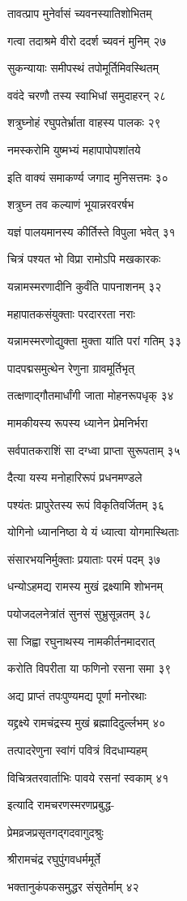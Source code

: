 तावत्प्राप मुनेर्वासं च्यवनस्यातिशोभितम्

गत्वा तदाश्रमे वीरो ददर्श च्यवनं मुनिम् २७

सुकन्यायाः समीपस्थं तपोमूर्तिमिवस्थितम्

ववंदे चरणौ तस्य स्वाभिधां समुदाहरन् २८

शत्रुघ्नोहं रघुपतेर्भ्राता वाहस्य पालकः २९

नमस्करोमि युष्मभ्यं महापापोपशांतये

इति वाक्यं समाकर्ण्य जगाद मुनिसत्तमः ३०

शत्रुघ्न तव कल्याणं भूयान्नरवरर्षभ

यज्ञं पालयमानस्य कीर्तिस्ते विपुला भवेत् ३१

चित्रं पश्यत भो विप्रा रामोऽपि मखकारकः

यन्नामस्मरणादीनि कुर्वंति पापनाशनम् ३२

महापातकसंयुक्ताः परदाररता नराः

यन्नामस्मरणोद्युक्ता मुक्ता यांति परां गतिम् ३३

पादपद्मसमुत्थेन रेणुना ग्रावमूर्तिभृत्

तत्क्षणाद्गौतमार्धांगी जाता मोहनरूपधृक् ३४

मामकीयस्य रूपस्य ध्यानेन प्रेमनिर्भरा

सर्वपातकराशिं सा दग्ध्वा प्राप्ता सुरूपताम् ३५

दैत्या यस्य मनोहारिरूपं प्रधनमण्डले

पश्यंतः प्रापुरेतस्य रूपं विकृतिवर्जितम् ३६

योगिनो ध्याननिष्ठा ये यं ध्यात्वा योगमास्थिताः

संसारभयनिर्मुक्ताः प्रयाताः परमं पदम् ३७

धन्योऽहमद्य रामस्य मुखं द्रक्ष्यामि शोभनम्

पयोजदलनेत्रांतं सुनसं सुभ्रुसून्नतम् ३८

सा जिह्वा रघुनाथस्य नामकीर्तनमादरात्

करोति विपरीता या फणिनो रसना समा ३९

अद्य प्राप्तं तपःपुण्यमद्य पूर्णा मनोरथाः

यद्द्रक्ष्ये रामचंद्रस्य मुखं ब्रह्मादिदुर्ल्लभम् ४०

तत्पादरेणुना स्वांगं पवित्रं विदधाम्यहम्

विचित्रतरवार्ताभिः पावये रसनां स्वकाम् ४१

इत्यादि रामचरणस्मरणप्रबुद्ध-

प्रेमव्रजप्रसृतगद्गदवागुदश्रुः

श्रीरामचंद्र रघुपुंगवधर्ममूर्ते

भक्तानुकंपकसमुद्धर संसृतेर्माम् ४२

